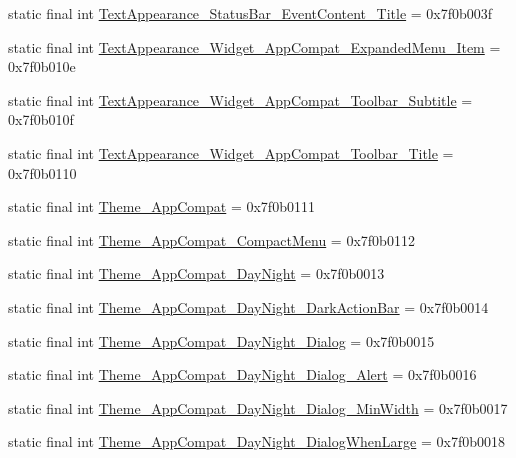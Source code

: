 \begin{CompactItemize}
\item 
static final int \hyperlink{classandroid_1_1support_1_1v7_1_1cardview_1_1_r_1_1style_51fa7b99e50e602b5dcd5521fc5d66fb}{TextAppearance\_\-StatusBar\_\-EventContent\_\-Title} = 0x7f0b003f
\item 
static final int \hyperlink{classandroid_1_1support_1_1v7_1_1cardview_1_1_r_1_1style_42d6581b488351dc85b09ddb9f256a78}{TextAppearance\_\-Widget\_\-AppCompat\_\-ExpandedMenu\_\-Item} = 0x7f0b010e
\item 
static final int \hyperlink{classandroid_1_1support_1_1v7_1_1cardview_1_1_r_1_1style_96fa921bcf09f98d52ceb36166fe37fd}{TextAppearance\_\-Widget\_\-AppCompat\_\-Toolbar\_\-Subtitle} = 0x7f0b010f
\item 
static final int \hyperlink{classandroid_1_1support_1_1v7_1_1cardview_1_1_r_1_1style_0c4cf5f672fcfd24285a62642a65e923}{TextAppearance\_\-Widget\_\-AppCompat\_\-Toolbar\_\-Title} = 0x7f0b0110
\item 
static final int \hyperlink{classandroid_1_1support_1_1v7_1_1cardview_1_1_r_1_1style_fc6638eea0cd86d0d1348b526b97e064}{Theme\_\-AppCompat} = 0x7f0b0111
\item 
static final int \hyperlink{classandroid_1_1support_1_1v7_1_1cardview_1_1_r_1_1style_a4ae13b813d290b5ab617c2fdd65d997}{Theme\_\-AppCompat\_\-CompactMenu} = 0x7f0b0112
\item 
static final int \hyperlink{classandroid_1_1support_1_1v7_1_1cardview_1_1_r_1_1style_95a3c999367239ee523e3941ceacd906}{Theme\_\-AppCompat\_\-DayNight} = 0x7f0b0013
\item 
static final int \hyperlink{classandroid_1_1support_1_1v7_1_1cardview_1_1_r_1_1style_226d10af2debc027819eb222ed7c3df6}{Theme\_\-AppCompat\_\-DayNight\_\-DarkActionBar} = 0x7f0b0014
\item 
static final int \hyperlink{classandroid_1_1support_1_1v7_1_1cardview_1_1_r_1_1style_585ae8c6a3a354f32fc98f7115281e80}{Theme\_\-AppCompat\_\-DayNight\_\-Dialog} = 0x7f0b0015
\item 
static final int \hyperlink{classandroid_1_1support_1_1v7_1_1cardview_1_1_r_1_1style_f934a98e061ceee59285ec083681ce6c}{Theme\_\-AppCompat\_\-DayNight\_\-Dialog\_\-Alert} = 0x7f0b0016
\item 
static final int \hyperlink{classandroid_1_1support_1_1v7_1_1cardview_1_1_r_1_1style_d6308f36000bdf811a11c382dcb28dba}{Theme\_\-AppCompat\_\-DayNight\_\-Dialog\_\-MinWidth} = 0x7f0b0017
\item 
static final int \hyperlink{classandroid_1_1support_1_1v7_1_1cardview_1_1_r_1_1style_86f29fbf7691f930abb6a0cb887d5189}{Theme\_\-AppCompat\_\-DayNight\_\-DialogWhenLarge} = 0x7f0b0018

\end{CompactItemize}
